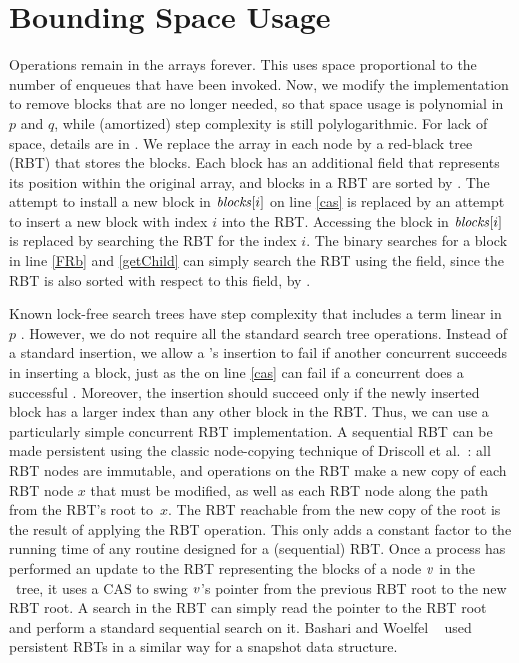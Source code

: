 
\section{Bounding Space Usage}
\label{reducing}

Operations remain in the  arrays forever. 
This uses space proportional to the number of enqueues that have been invoked.
Now, we modify the implementation to remove blocks that are no longer needed, so that space usage is
polynomial in $p$ and $q$, while (amortized) step complexity is still polylogarithmic.  For lack of space, details are in %
\cite{full}.
We replace the  array in each node by a red-black tree (RBT)
that stores the blocks.
Each block has an additional  field
that represents its position within the original  array, and
blocks in a RBT are sorted by .
The attempt to install a new block in $\mbox{\textit{blocks}}[i]$  on line \ref{cas}
is replaced by an attempt to insert a new block with index $i$ into the RBT.
Accessing the block in $\mbox{\textit{blocks}}[i]$ is 
replaced by searching the RBT for the  index $i$.
The binary searches for a block in line \ref{FRb} and \ref{getChild} can simply search the RBT
using the  field, since the RBT is also sorted with respect to this field, by .
 
Known lock-free search trees have step complexity that includes a term linear in $p$ \cite{EFHR14,Ko20}.  
However, we do not require all the standard search tree operations.
Instead of a standard insertion, we allow a 's insertion to fail if another
concurrent  succeeds in inserting a block, just as the  on line \ref{cas}
can fail if a concurrent  does a successful .
Moreover, the insertion should succeed only if the newly inserted block has a larger index than any other block in the RBT.
Thus, we can use a particularly simple concurrent RBT implementation.
A sequential RBT can be made persistent using the classic node-copying technique of 
Driscoll et al.~\cite{DSST89}:  all RBT nodes are immutable, and operations on the 
RBT make a new copy of each RBT node $x$ that must be modified, as well
as each RBT node along the path from the RBT's root to~$x$.
The RBT reachable from the new copy of the root is the result of applying the RBT operation.
This only adds a constant factor to the running time of any routine designed for a (sequential) RBT.
Once a process has performed an update to the RBT representing the blocks of a node 
$\mbox{\textnormal{\textit{v}}}$ in the \ordering\ tree, 
it uses a CAS to swing $\mbox{\textnormal{\textit{v}}}$'s pointer from the previous RBT root to the new RBT root.
A search in the RBT can simply read the pointer to the RBT root and perform a standard
sequential search on it.
Bashari and Woelfel ~\cite{DBLP:conf/podc/BashariW21} used persistent RBTs in a similar way for a snapshot data structure.


